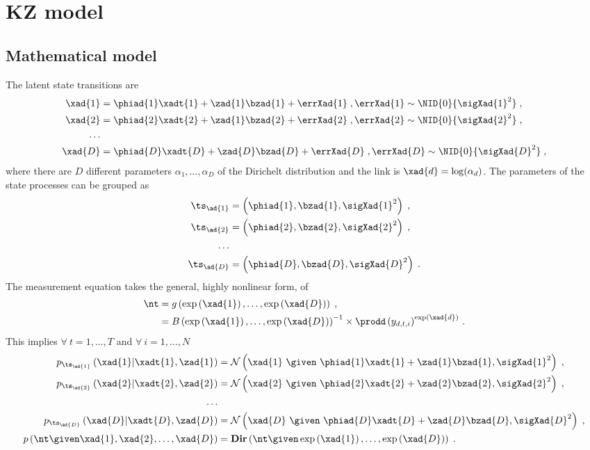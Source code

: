 \section{KZ model}
\subsection{Mathematical model}
The latent state transitions are
\begin{align*}
\xad{1} &= \phiad{1}\xadt{1} + \zad{1}\bzad{1} + \errXad{1}\;,\errXad{1}\sim\NID{0}{\sigXad{1}^2}\;,\\
\xad{2} &= \phiad{2}\xadt{2} + \zad{1}\bzad{2} + \errXad{2}\;,\errXad{2}\sim\NID{0}{\sigXad{2}^2}\;,\\
\ldots &\\
\xad{D} &= \phiad{D}\xadt{D} + \zad{D}\bzad{D} + \errXad{D}\;,\errXad{D}\sim\NID{0}{\sigXad{D}^2}\;,
\end{align*}
where there are $D$ different parameters $\alpha_1,\ldots,\alpha_D$ of the Dirichelt distribution and the link is $\xad{d}=\log(\alpha_{d})$. The parameters of the state processes can be grouped as
\begin{align*}
\ts_{\ad{1}} &=\left(\phiad{1},\bzad{1},\sigXad{1}^2\right)\;,\\
\ts_{\ad{2}} &=\left(\phiad{2},\bzad{2},\sigXad{2}^2\right)\;,\\
\ldots &\\
\ts_{\ad{D}} &=\left(\phiad{D},\bzad{D},\sigXad{D}^2\right)\;.
\end{align*}
The measurement equation takes the general, highly nonlinear form, of
\begin{align*}
\nt &= g\left(\exp\left(\xad{1}\right),\ldots,\exp\left(\xad{D}\right)\right)\;,\\
& = B\left(\exp\left(\xad{1}\right),\ldots,\exp\left(\xad{D}\right)\right)^{-1}
\times \prodd \left(y_{d,t,i}\right)^{\exp\left(\xad{d}\right)}\,.
\end{align*}
This implies $\forall~t=1,\ldots,T$ and $\forall~i=1,\ldots,N$
\begin{align*}
p_{\ts_{\ad{1}}}\left(\xad{1}|\xadt{1},\zad{1}\right)
&=
\mathcal{N}\left(\xad{1}~\given~\phiad{1}\xadt{1}+\zad{1}\bzad{1},\sigXad{1}^2\right)\;,\\
p_{\ts_{\ad{2}}}\left(\xad{2}|\xadt{2},\zad{2}\right)
&=
\mathcal{N}\left(\xad{2}~\given~\phiad{2}\xadt{2}+\zad{2}\bzad{2},\sigXad{2}^2\right)\;,\\
\ldots
&\\
p_{\ts_{\ad{D}}}\left(\xad{D}|\xadt{D},\zad{D}\right)
&=
\mathcal{N}\left(\xad{D}~\given~\phiad{D}\xadt{D}+\zad{D}\bzad{D},\sigXad{D}^2\right)\;,\\
p
\left(
\nt\given 
\xad{1},\xad{2},\ldots,\xad{D}
\right)&=
\mathbf{Dir}\left(\nt\given\exp\left(\xad{1}\right),\ldots,\exp\left(\xad{D}\right)\right)\;.
\end{align*}
